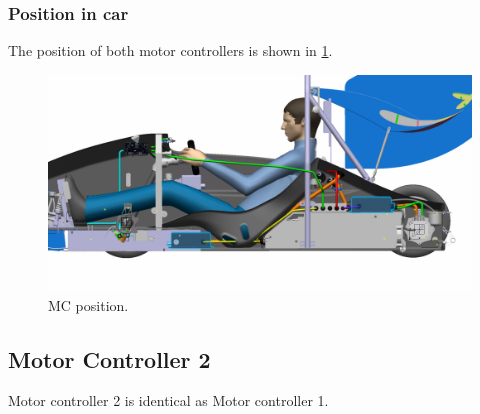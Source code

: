 \subsubsection{Position in car}

The position of both motor controllers is shown in \ref{fig:MC:position}.

\begin{figure}[H]
	\centering
	\includegraphics[width=\textwidth]{./img/MC-position.jpg}
	\caption{MC position.}
	\label{fig:MC:position}
\end{figure}
\subsection{Motor Controller 2}
Motor controller 2 is identical as Motor controller 1.




